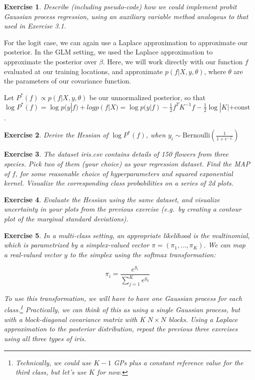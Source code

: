 \documentclass[twoside]{article}
\newcounter{lecnum}
\newtheorem{exercise}{Exercise}[lecnum]
\begin{document}
 \begin{exercise}
   Describe (including pseudo-code) how we could implement probit Gaussian process regression, using an auxiliary variable method analogous to that used in Exercise 3.1.
 \end{exercise}

 For the logit case, we can again use a Laplace approximation to approximate our posterior. In the GLM setting, we used the Laplace approximation to approximate the posterior over $\beta$. Here, we will work directly with our function $f$ evaluated at our training locations, and approximate $p(f|X,y,\theta)$, where $\theta$ are the parameters of our covariance function.

 Let $P^*(f)\propto p(f|X,y,\theta)$ be our unnormalized posterior, so that $\log P^*(f) = \log p(y|f) + log p(f|X) = \log p(y|f) -\frac{1}{2}f^TK^{-1}f - \frac{1}{2}\log|K| + \mbox{const}$.

 \begin{exercise}
   Derive the Hessian of $\log P^*(f)$, when $y_i \sim \mbox{Bernoulli}\left(\frac{1}{1+e^{-f_i}}\right)$
 \end{exercise}

 \begin{exercise}
   The dataset iris.csv contains details of 150 flowers from three species. Pick two of them (your choice) as your regression dataset. Find the MAP of $f$, for some reasonable choice of hyperparameters and squared exponential kernel. Visualize the corresponding class probabilities on a series of 2d plots.
 \end{exercise}

 \begin{exercise}
   Evaluate the Hessian using the same dataset, and visualize uncertainty in your plots from the previous exercise (e.g.\ by creating a contour plot of the marginal standard deviations).
   \end{exercise}


 \begin{exercise}
   In a multi-class setting, an appropriate likelihood is the multinomial, which is parametrized by a simplex-valued vector $\pi = (\pi_1,\dots, \pi_K)$. We can map a real-valued vector $y$ to the simplex using the softmax transformation:

   $$\pi_i = \frac{e^{y_i}}{\sum_{j=1}^K e^{y_k}}$$

   To use this transformation, we will have to have one Gaussian process for each class.\footnote{Technically, we could use $K-1$ GPs plus a constant reference value for the third class, but let's use $K$ for now.} Practically, we can think of this as using a single Gaussian process, but with a block-diagonal covariance matrix with K $N\times N$ blocks. Using a Laplace approximation to the posterior distribution, repeat the previous three exercises using all three types of iris.
   \end{exercise}
   
 




  
  
\end{document}
